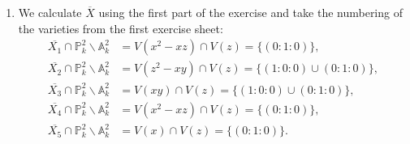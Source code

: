 \begin{exercise}{1}
\begin{enumerate}



        \item{} We calculate $\overline{X}$ using the first part of the exercise and take the numbering of the
        varieties from the first exercise sheet:\\
        \begin{align*}
            \overline{X_1}\cap \mathbb{P}^2_k \backslash
            \mathbb{A}^2_k&=V(x^2-xz)\cap V(z)=\{(0:1:0)\},\\
            \overline{X_2}\cap \mathbb{P}^2_k \backslash
            \mathbb{A}^2_k&=V(z^2-xy)\cap V(z)=\{(1:0:0) \cup (0:1:0)\},\\
            \overline{X_3}\cap \mathbb{P}^2_k \backslash
            \mathbb{A}^2_k&=V(xy)\cap V(z)=\{(1:0:0) \cup (0:1:0)\},\\
            \overline{X_4}\cap \mathbb{P}^2_k \backslash
            \mathbb{A}^2_k&=V(x^2-xz)\cap V(z)=\{(0:1:0)\},\\
            \overline{X_5}\cap \mathbb{P}^2_k \backslash
            \mathbb{A}^2_k&=V(x)\cap V(z)= \{(0:1:0)\}.
        \end{align*}


\end{enumerate}
\end{exercise}
